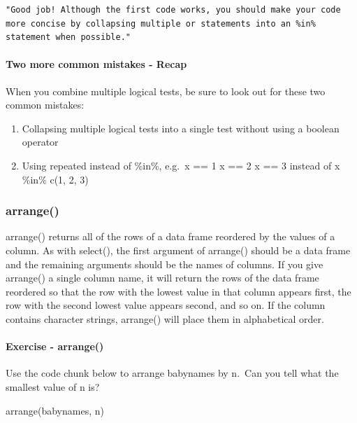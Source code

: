 \documentclass[
]{article}
\newenvironment{Shaded}{\begin{snugshade}}{\end{snugshade}}
\newcommand{\FunctionTok}[1]{\textcolor[rgb]{0.00,0.00,0.00}{#1}}
\newcommand{\NormalTok}[1]{#1}
\providecommand{\tightlist}{%
  \setlength{\itemsep}{0pt}\setlength{\parskip}{0pt}}
\begin{document}
\begin{verbatim}
"Good job! Although the first code works, you should make your code more concise by collapsing multiple or statements into an %in% statement when possible."
\end{verbatim}

\hypertarget{two-more-common-mistakes---recap}{%
\paragraph{Two more common mistakes -
Recap}\label{two-more-common-mistakes---recap}}

When you combine multiple logical tests, be sure to look out for these
two common mistakes:

\begin{enumerate}
\def\labelenumi{\arabic{enumi}.}
\tightlist
\item
  Collapsing multiple logical tests into a single test without using a
  boolean operator
\item
  Using repeated \textbar{} instead of \%in\%, e.g.~x == 1 \textbar{} x
  == 2 \textbar{} x == 3 instead of x \%in\% c(1, 2, 3)
\end{enumerate}

\hypertarget{arrange}{%
\subsubsection{arrange()}\label{arrange}}

arrange() returns all of the rows of a data frame reordered by the
values of a column. As with select(), the first argument of arrange()
should be a data frame and the remaining arguments should be the names
of columns. If you give arrange() a single column name, it will return
the rows of the data frame reordered so that the row with the lowest
value in that column appears first, the row with the second lowest value
appears second, and so on. If the column contains character strings,
arrange() will place them in alphabetical order.

\hypertarget{exercise---arrange}{%
\paragraph{Exercise - arrange()}\label{exercise---arrange}}

Use the code chunk below to arrange babynames by n.~Can you tell what
the smallest value of n is?

\begin{Shaded}
\begin{Highlighting}[]
\FunctionTok{arrange}\NormalTok{(babynames, n)}
\end{Highlighting}
\end{Shaded}
\end{document}
